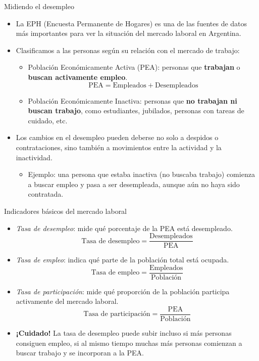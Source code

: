 \documentclass{beamer}
\begin{document}
\begin{frame}{Midiendo el desempleo}
    \begin{itemize}
    \small \item La EPH (Encuesta Permanente de Hogares) es una de las fuentes de datos más importantes para ver la situación del mercado laboral en Argentina.
    \small  \item Clasificamos a las personas según su relación con el mercado de trabajo:
        \begin{itemize}
            \item Población Económicamente Activa (PEA): personas que \textbf{trabajan} o \textbf{buscan activamente empleo}.
                \[
        \text{PEA} = \text{Empleados}+\text{Desempleados}
                \]
            \item Población Económicamente Inactiva: personas que \textbf{no trabajan ni buscan trabajo}, como estudiantes, jubilados, personas con tareas de cuidado, etc.
        \end{itemize}
        
     \small \item Los cambios en el desempleo pueden deberse no solo a despidos o contrataciones, sino también a movimientos entre la actividad y la inactividad.
        \begin{itemize}
            \item Ejemplo: una persona que estaba inactiva (no buscaba trabajo) comienza a buscar empleo y pasa a ser desempleada, aunque aún no haya sido contratada.
        \end{itemize}
    \end{itemize}
\end{frame}

\begin{frame}{Indicadores básicos del mercado laboral}
    \small
    \begin{itemize}
        \item \textit{Tasa de desempleo}: mide qué porcentaje de la PEA está desempleado.
        \[
        \text{Tasa de desempleo} = \frac{\text{Desempleados}}{\text{PEA}}
        \]
        
        \item \textit{Tasa de empleo}: indica qué parte de la población total está ocupada.
        \[
        \text{Tasa de empleo} = \frac{\text{Empleados}}{\text{Población}}
        \]
        
        \item \textit{Tasa de participación}: mide qué proporción de la población participa activamente del mercado laboral.
        \[
        \text{Tasa de participación} = \frac{\text{PEA}}{\text{Población}}
        \]
        
        \item \textbf{¡Cuidado!} La tasa de desempleo puede subir incluso si más personas consiguen empleo, si al mismo tiempo muchas más personas comienzan a buscar trabajo y se incorporan a la PEA.
    \end{itemize}

\end{frame}
\end{document}
